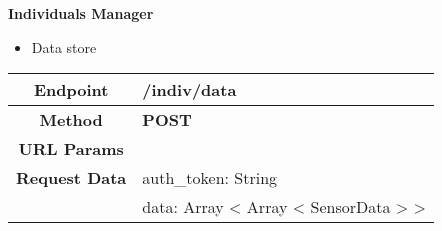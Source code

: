     \textbf{Individuals Manager}
    \begin{itemize}
        \item Data store
    \end{itemize}
    \begin{adjustwidth}{1cm}{}
        \begin{longtable}{|c|l|}
            \hline
            \textbf{Endpoint} & /indiv/data \\
            \hline
            \textbf{Method} & \textbf{POST} \\
            \hline
            \textbf{URL Params} &  \\
            \hline
            \textbf{Request Data} & auth\_token: String \\
            &                 data: Array < Array < SensorData > > \\
            

\end{longtable}
\end{adjustwidth}
